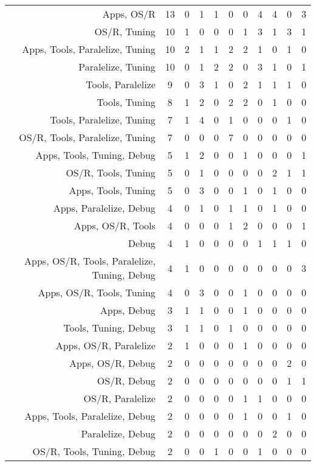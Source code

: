 {\begin{landscape}
\begin{longtable}[htb]{r|c|c|c|c|c|c|c|c|c|c}
{Apps, OS/R} & 13 & 0 & 1 & 1 & 0 & 0 & 4 & 4 & 0 & 3 \\%
{OS/R, Tuning} & 10 & 1 & 0 & 0 & 0 & 1 & 3 & 1 & 3 & 1 \\%
{Apps, Tools, Paralelize, Tuning} & 10 & 2 & 1 & 1 & 2 & 2 & 1 & 0 & 1 & 0 \\%
{Paralelize, Tuning} & 10 & 0 & 1 & 2 & 2 & 0 & 3 & 1 & 0 & 1 \\%
{Tools, Paralelize} & 9 & 0 & 3 & 1 & 0 & 2 & 1 & 1 & 1 & 0 \\%
{Tools, Tuning} & 8 & 1 & 2 & 0 & 2 & 2 & 0 & 1 & 0 & 0 \\%
{Tools, Paralelize, Tuning} & 7 & 1 & 4 & 0 & 1 & 0 & 0 & 0 & 1 & 0 \\%
{OS/R, Tools, Paralelize, Tuning} & 7 & 0 & 0 & 0 & 7 & 0 & 0 & 0 & 0 & 0 \\%
{Apps, Tools, Tuning, Debug} & 5 & 1 & 2 & 0 & 0 & 1 & 0 & 0 & 0 & 1 \\%
{OS/R, Tools, Tuning} & 5 & 0 & 1 & 0 & 0 & 0 & 0 & 2 & 1 & 1 \\%
{Apps, Tools, Tuning} & 5 & 0 & 3 & 0 & 0 & 1 & 0 & 1 & 0 & 0 \\%
{Apps, Paralelize, Debug} & 4 & 0 & 1 & 0 & 1 & 1 & 0 & 1 & 0 & 0 \\%
{Apps, OS/R, Tools} & 4 & 0 & 0 & 0 & 1 & 2 & 0 & 0 & 0 & 1 \\%
{Debug} & 4 & 1 & 0 & 0 & 0 & 0 & 1 & 1 & 1 & 0 \\%
{Apps, OS/R, Tools, Paralelize, Tuning, Debug} & 4 & 1 & 0 & 0 & 0 & 0 & 0 & 0 & 0 & 3 \\%
{Apps, OS/R, Tools, Tuning} & 4 & 0 & 3 & 0 & 0 & 1 & 0 & 0 & 0 & 0 \\%
{Apps, Debug} & 3 & 1 & 1 & 0 & 0 & 1 & 0 & 0 & 0 & 0 \\%
{Tools, Tuning, Debug} & 3 & 1 & 1 & 0 & 1 & 0 & 0 & 0 & 0 & 0 \\%
{Apps, OS/R, Paralelize} & 2 & 1 & 0 & 0 & 0 & 1 & 0 & 0 & 0 & 0 \\%
{Apps, OS/R, Debug} & 2 & 0 & 0 & 0 & 0 & 0 & 0 & 0 & 2 & 0 \\%
{OS/R, Debug} & 2 & 0 & 0 & 0 & 0 & 0 & 0 & 0 & 1 & 1 \\%
{OS/R, Paralelize} & 2 & 0 & 0 & 0 & 0 & 1 & 1 & 0 & 0 & 0 \\%
{Apps, Tools, Paralelize, Debug} & 2 & 0 & 0 & 0 & 0 & 1 & 0 & 0 & 1 & 0 \\%
{Paralelize, Debug} & 2 & 0 & 0 & 0 & 0 & 0 & 0 & 2 & 0 & 0 \\%
{OS/R, Tools, Tuning, Debug} & 2 & 0 & 0 & 1 & 0 & 0 & 1 & 0 & 0 & 0 \\%

\end{longtable}
\end{landscape}}
